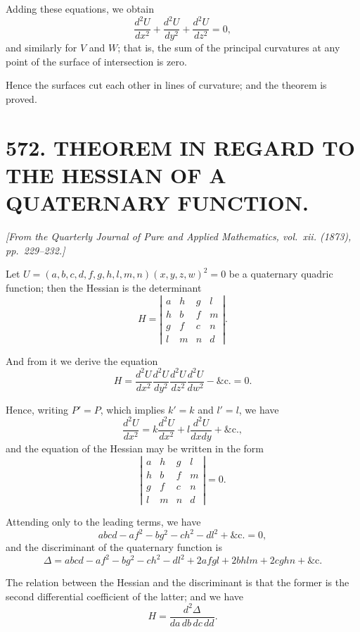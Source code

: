 \documentclass[11pt,a4paper]{article}
\theoremstyle{plain}
\theoremstyle{definition}
\theoremstyle{remark}
\newcommand{\paper}[2]{\section*{#1 #2}}
\newcommand{\papersource}[1]{\par\noindent\textit{#1}\par\medskip}
\begin{document}
\newpage

Adding these equations, we obtain
\[
\frac{d^2U}{dx^2} + \frac{d^2U}{dy^2} + \frac{d^2U}{dz^2} = 0,
\]
and similarly for $V$ and $W$; that is, the sum of the principal curvatures at any point of the surface of intersection is zero.

Hence the surfaces cut each other in lines of curvature; and the theorem is proved.

\newpage
\paper{572.}{THEOREM IN REGARD TO THE HESSIAN OF A QUATERNARY FUNCTION.}

\papersource{[From the Quarterly Journal of Pure and Applied Mathematics, vol.~xii. (1873), pp.~229--232.]}

Let $U = (a, b, c, d, f, g, h, l, m, n)(x, y, z, w)^2 = 0$ be a quaternary quadric function; then the Hessian is the determinant
\[
H = \left| \begin{array}{cccc}
a & h & g & l \\
h & b & f & m \\
g & f & c & n \\
l & m & n & d
\end{array} \right|.
\]

And from it we derive the equation
\[
H = \frac{d^2U}{dx^2}\frac{d^2U}{dy^2}\frac{d^2U}{dz^2}\frac{d^2U}{dw^2} - \&\text{c.} = 0.
\]

\newpage

Hence, writing $P' = P$, which implies $k' = k$ and $l' = l$, we have
\[
\frac{d^2U}{dx^2} = k\frac{d^2U}{dx^2} + l\frac{d^2U}{dxdy} + \&\text{c.},
\]
and the equation of the Hessian may be written in the form
\[
\left| \begin{array}{cccc}
a & h & g & l \\
h & b & f & m \\
g & f & c & n \\
l & m & n & d
\end{array} \right| = 0.
\]

Attending only to the leading terms, we have
\[
abcd - af^2 - bg^2 - ch^2 - dl^2 + \&\text{c.} = 0,
\]
and the discriminant of the quaternary function is
\[
\Delta = abcd - af^2 - bg^2 - ch^2 - dl^2 + 2afgl + 2bhlm + 2cghn + \&\text{c.}
\]

The relation between the Hessian and the discriminant is that the former is the second differential coefficient of the latter; and we have
\[
H = \frac{d^2\Delta}{da\,db\,dc\,dd}.
\]
\end{document}

